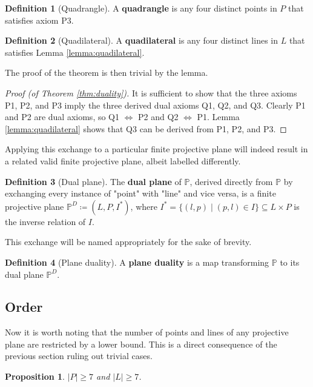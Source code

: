 \documentclass{report}
\renewcommand{\P}{\mathbb{P}}
\newtheorem{proposition}[theorem]{Proposition}
\theoremstyle{definition}\newtheorem*{definition}{Definition}
\theoremstyle{definition}\newtheorem*{example}{Example}
\theoremstyle{remark}\newtheorem*{remark}{Remark}
\begin{document}
\begin{definition}[Quadrangle]
A \textbf{quadrangle} is any four distinct points in $ P $ that satisfies axiom P3.
\end{definition}

\begin{definition}[Quadilateral]
A \textbf{quadilateral} is any four distinct lines in $ L $ that satisfies Lemma \ref{lemma:quadilateral}.
\end{definition}

The proof of the theorem is then trivial by the lemma.

\begin{proof}[Proof (of Theorem \ref{thm:duality})]
It is sufficient to show that the three axioms P1, P2, and P3 imply the three derived dual axioms Q1, Q2, and Q3. Clearly P1 and P2 are dual axioms, so Q1 $ \Leftrightarrow $ P2 and Q2 $ \Leftrightarrow $ P1. Lemma \ref{lemma:quadilateral} shows that Q3 can be derived from P1, P2, and P3.
\end{proof}

Applying this exchange to a particular finite projective plane will indeed result in a related valid finite projective plane, albeit labelled differently.

\begin{definition}[Dual plane]
The \textbf{dual plane} of $ \P $, derived directly from $ \P $ by exchanging every instance of "point" with "line" and vice versa, is a finite projective plane $ \P^D \coloneqq (L, P, I^*) $, where $ I^* = \{ (l, p) \mid (p, l) \in I \} \subseteq L \times P $ is the inverse relation of $ I $.
\end{definition}

This exchange will be named appropriately for the sake of brevity.

\begin{definition}[Plane duality]
A \textbf{plane duality} is a map transforming $ \P $ to its dual plane $ \P^D $.
\end{definition}

\subsection{Order}

Now it is worth noting that the number of points and lines of any projective plane are restricted by a lower bound. This is a direct consequence of the previous section ruling out trivial cases.

\begin{proposition}
\label{prop:pointslines7}
$ |P| \ge 7 $ and $ |L| \ge 7 $.
\end{proposition}
\end{document}
